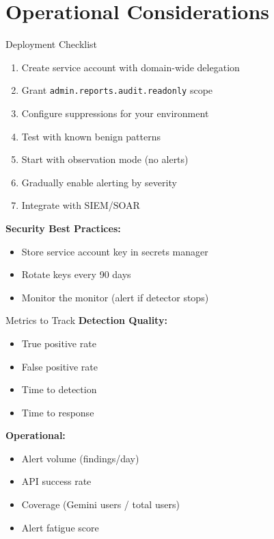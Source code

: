 \documentclass[aspectratio=169]{beamer}
\begin{document}
\section{Operational Considerations}

\begin{frame}{Deployment Checklist}
\begin{enumerate}
    \item Create service account with domain-wide delegation
    \item Grant \texttt{admin.reports.audit.readonly} scope
    \item Configure suppressions for your environment
    \item Test with known benign patterns
    \item Start with observation mode (no alerts)
    \item Gradually enable alerting by severity
    \item Integrate with SIEM/SOAR
\end{enumerate}

\vspace{1em}

\textbf{Security Best Practices:}
\begin{itemize}
    \item Store service account key in secrets manager
    \item Rotate keys every 90 days
    \item Monitor the monitor (alert if detector stops)
\end{itemize}
\end{frame}

\begin{frame}{Metrics to Track}
\textbf{Detection Quality:}
\begin{itemize}
    \item True positive rate
    \item False positive rate
    \item Time to detection
    \item Time to response
\end{itemize}

\vspace{1em}

\textbf{Operational:}
\begin{itemize}
    \item Alert volume (findings/day)
    \item API success rate
    \item Coverage (Gemini users / total users)
    \item Alert fatigue score
\end{itemize}
\end{frame}
\end{document}
